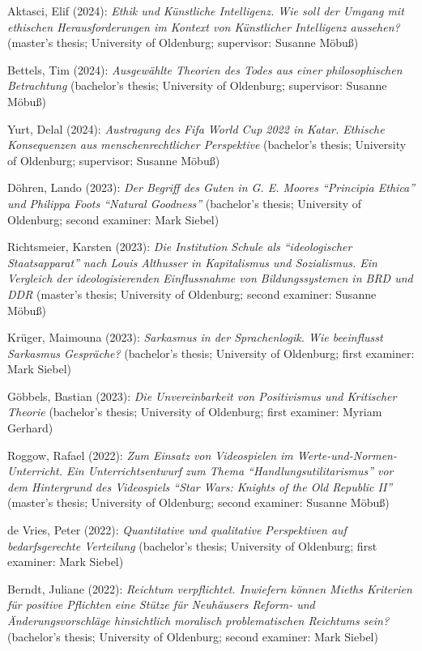 \documentclass[a4paper,10pt]{article}
\newenvironment{literature}{%
   \parskip6pt\parindent0pt\raggedright
   \def\lititem{\hangindent=1cm\hangafter1}}{%
   \par\ignorespaces}
\begin{document}
\begin{literature}
\lititem Aktasci, Elif (2024): \textit{Ethik und Künstliche Intelligenz. Wie soll der Umgang mit ethischen Herausforderungen im Kontext von Künstlicher Intelligenz aussehen?} (master's thesis; University of Oldenburg; supervisor: Susanne Möbuß)

\lititem Bettels, Tim (2024): \textit{Ausgewählte Theorien des Todes aus einer philosophischen Betrachtung} (bachelor's thesis; University of Oldenburg; supervisor: Susanne Möbuß)

\lititem Yurt, Delal (2024): \textit{Austragung des Fifa World Cup 2022 in Katar. Ethische Konsequenzen aus menschenrechtlicher Perspektive} (bachelor's thesis; University of Oldenburg; supervisor: Susanne Möbuß)

\lititem Döhren, Lando (2023): \textit{Der Begriff des Guten in G. E. Moores \enquote{Principia Ethica} und Philippa Foots \enquote{Natural Goodness}} (bachelor's thesis; University of Oldenburg; second examiner: Mark Siebel)

\lititem Richtsmeier, Karsten (2023): \textit{Die Institution Schule als \enquote{ideologischer Staatsapparat} nach Louis Althusser in Kapitalismus und Sozialismus. Ein Vergleich der ideologisierenden Einflussnahme von Bildungssystemen in BRD und DDR} (master's thesis; University of Oldenburg; second examiner: Susanne Möbuß)

\lititem Krüger, Maimouna (2023): \textit{Sarkasmus in der Sprachenlogik. Wie beeinflusst Sarkasmus Gespräche?} (bachelor's thesis; University of Oldenburg; first examiner: Mark Siebel)

\lititem Göbbels, Bastian (2023): \textit{Die Unvereinbarkeit von Positivismus und Kritischer Theorie} (bachelor's thesis; University of Oldenburg; first examiner: Myriam Gerhard)

\lititem Roggow, Rafael (2022): \textit{Zum Einsatz von Videospielen im Werte-und-Normen-Unterricht. Ein Unterrichtsentwurf zum Thema \enquote{Handlungsutilitarismus} vor dem Hintergrund des Videospiels \enquote{Star Wars: Knights of the Old Republic II}} (master's thesis; University of Oldenburg; second examiner: Susanne Möbuß)

\lititem de Vries, Peter (2022): \textit{Quantitative und qualitative Perspektiven auf bedarfsgerechte Verteilung} (bachelor's thesis; University of Oldenburg; first examiner: Mark Siebel)

\lititem Berndt, Juliane (2022): \textit{Reichtum verpflichtet. Inwiefern können Mieths Kriterien für positive Pflichten eine Stütze für Neuhäusers Reform- und Änderungsvorschläge hinsichtlich moralisch problematischen Reichtums sein?} (bachelor's thesis; University of Oldenburg; second examiner: Mark Siebel)


\end{literature}
\end{document}
